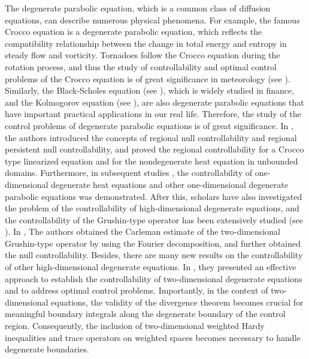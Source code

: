 \documentclass[9pt,reqno]{amsart}
\theoremstyle{plain}
\numberwithin{equation}{section}
\numberwithin{theorem}{section}
\begin{document}
	The degenerate parabolic equation, which is a common class of diffusion equations, can describe numerous physical phenomena. For example, the famous Crocco equation is a degenerate parabolic equation, which reflects the compatibility relationship between the change in total energy and entropy in steady flow and vorticity. Tornadoes follow the Crocco equation during the rotation process, and thus the study of controllability and optimal control problems of the Crocco equation is of great significance in meteorology (see \cite{martinez2003regional}). Similarly, the Black-Scholes equation (see \cite{sakthivel2008exact}), which is widely studied in finance, and the Kolmogorov equation (see \cite{calin2009heat,calin2010heat,anceschi2019survey}), are also degenerate parabolic equations that have important practical applications in our real life. Therefore, the study of the control problems of degenerate parabolic equations is of great significance.
	In \cite{cannarsa2004persistent}, the authors introduced the concepts of regional null controllability and regional persistent null controllability, and proved the regional controllability for a Crocco type linearized equation and for the nondegenerate heat equation in unbounded domains. Furthermore, in subsequent studies \cite{CA5,CA8,flores2010carleman,cannarsa2007null,cannarsa2008controllability}, the controllability of one-dimensional degenerate heat equations and other one-dimensional degenerate parabolic equations was demonstrated. After this, scholars have also investigated the problem of the controllability of high-dimensional degenerate equations, and the controllability of the Grushin-type operator has been extensively studied  (see \cite{anh2013null,cannarsa2013null,beauchard20152d,banerjee2022carleman}).
	In \cite{cannarsa2013null}, The authors obtained the Carleman estimate of the two-dimensional Grushin-type operator by using the Fourier decomposition,
	and further obtained the null controllability. Besides, there are many new results on the controllability of other high-dimensional degenerate equations.
	In  \cite{CA6}, they presented an effective approach to establish the controllability of two-dimensional degenerate equations and to address optimal control problems. Importantly, in the context of two-dimensional equations, the validity of the divergence theorem becomes crucial for meaningful boundary integrals along the degenerate boundary of the control region. Consequently, the inclusion of two-dimensional weighted Hardy inequalities and trace operators on weighted spaces becomes necessary to handle degenerate boundaries. 
	
\end{document}

